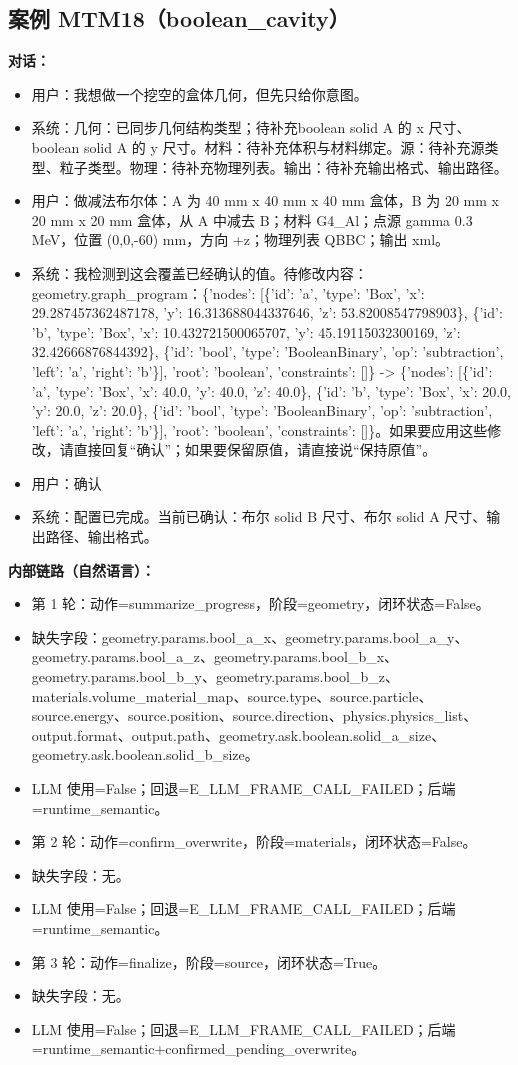 \documentclass[11pt]{ctexart}
\begin{document}
\subsection{案例 MTM18（boolean\_cavity）}
\textbf{对话：}
\begin{itemize}
\item 用户：我想做一个挖空的盒体几何，但先只给你意图。
\item 系统：几何：已同步几何结构类型；待补充boolean solid A 的 x 尺寸、boolean solid A 的 y 尺寸。材料：待补充体积与材料绑定。源：待补充源类型、粒子类型。物理：待补充物理列表。输出：待补充输出格式、输出路径。
\item 用户：做减法布尔体：A 为 40 mm x 40 mm x 40 mm 盒体，B 为 20 mm x 20 mm x 20 mm 盒体，从 A 中减去 B；材料 G4\_Al；点源 gamma 0.3 MeV，位置 (0,0,-60) mm，方向 +z；物理列表 QBBC；输出 xml。
\item 系统：我检测到这会覆盖已经确认的值。待修改内容：geometry.graph\_program：\{'nodes': [\{'id': 'a', 'type': 'Box', 'x': 29.287457362487178, 'y': 16.313688044337646, 'z': 53.82008547798903\}, \{'id': 'b', 'type': 'Box', 'x': 10.432721500065707, 'y': 45.19115032300169, 'z': 32.42666876844392\}, \{'id': 'bool', 'type': 'BooleanBinary', 'op': 'subtraction', 'left': 'a', 'right': 'b'\}], 'root': 'boolean', 'constraints': []\} -> \{'nodes': [\{'id': 'a', 'type': 'Box', 'x': 40.0, 'y': 40.0, 'z': 40.0\}, \{'id': 'b', 'type': 'Box', 'x': 20.0, 'y': 20.0, 'z': 20.0\}, \{'id': 'bool', 'type': 'BooleanBinary', 'op': 'subtraction', 'left': 'a', 'right': 'b'\}], 'root': 'boolean', 'constraints': []\}。如果要应用这些修改，请直接回复“确认”；如果要保留原值，请直接说“保持原值”。
\item 用户：确认
\item 系统：配置已完成。当前已确认：布尔 solid B 尺寸、布尔 solid A 尺寸、输出路径、输出格式。
\end{itemize}
\textbf{内部链路（自然语言）：}
\begin{itemize}
\item 第 1 轮：动作=summarize\_progress，阶段=geometry，闭环状态=False。
\item 缺失字段：geometry.params.bool\_a\_x、geometry.params.bool\_a\_y、geometry.params.bool\_a\_z、geometry.params.bool\_b\_x、geometry.params.bool\_b\_y、geometry.params.bool\_b\_z、materials.volume\_material\_map、source.type、source.particle、source.energy、source.position、source.direction、physics.physics\_list、output.format、output.path、geometry.ask.boolean.solid\_a\_size、geometry.ask.boolean.solid\_b\_size。
\item LLM 使用=False；回退=E\_LLM\_FRAME\_CALL\_FAILED；后端=runtime\_semantic。
\item 第 2 轮：动作=confirm\_overwrite，阶段=materials，闭环状态=False。
\item 缺失字段：无。
\item LLM 使用=False；回退=E\_LLM\_FRAME\_CALL\_FAILED；后端=runtime\_semantic。
\item 第 3 轮：动作=finalize，阶段=source，闭环状态=True。
\item 缺失字段：无。
\item LLM 使用=False；回退=E\_LLM\_FRAME\_CALL\_FAILED；后端=runtime\_semantic+confirmed\_pending\_overwrite。
\end{itemize}
\end{document}
